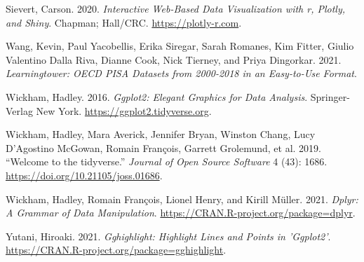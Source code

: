 \begin{CSLReferences}{1}{0}
\leavevmode{}%
Sievert, Carson. 2020. \emph{Interactive Web-Based Data Visualization with r, Plotly, and Shiny}. Chapman; Hall/CRC. \url{https://plotly-r.com}.

\leavevmode{}%
Wang, Kevin, Paul Yacobellis, Erika Siregar, Sarah Romanes, Kim Fitter, Giulio Valentino Dalla Riva, Dianne Cook, Nick Tierney, and Priya Dingorkar. 2021. \emph{Learningtower: OECD PISA Datasets from 2000-2018 in an Easy-to-Use Format}.

\leavevmode{}%
Wickham, Hadley. 2016. \emph{Ggplot2: Elegant Graphics for Data Analysis}. Springer-Verlag New York. \url{https://ggplot2.tidyverse.org}.

\leavevmode{}%
Wickham, Hadley, Mara Averick, Jennifer Bryan, Winston Chang, Lucy D'Agostino McGowan, Romain François, Garrett Grolemund, et al. 2019. {``Welcome to the {tidyverse}.''} \emph{Journal of Open Source Software} 4 (43): 1686. \url{https://doi.org/10.21105/joss.01686}.

\leavevmode{}%
Wickham, Hadley, Romain François, Lionel Henry, and Kirill Müller. 2021. \emph{Dplyr: A Grammar of Data Manipulation}. \url{https://CRAN.R-project.org/package=dplyr}.

\leavevmode{}%
Yutani, Hiroaki. 2021. \emph{Gghighlight: Highlight Lines and Points in 'Ggplot2'}. \url{https://CRAN.R-project.org/package=gghighlight}.

\end{CSLReferences}


\address{%
Priya Ravindra Dingorkar\\
Monash University\\%
Department of Econometrics and Business Statistics\\ Clayton, Australia\\
%
\url{https://www.linkedin.com/in/priya-dingorkar/}\\%
%
\href{mailto:priyadingorkar@gmail.com}{\nolinkurl{priyadingorkar@gmail.com}}%
}

\address{%
Kevin Y.X. Wang\\
University of Sydney\\%
School of Mathematics and Statistics\\ Sydney, Australia\\
%
\url{https://kevinwang09.github.io/}\\%
%
\href{mailto:kevinwangstats@gmail.com}{\nolinkurl{kevinwangstats@gmail.com}}%
}

\address{%
Dianne Cook\\
Monash University\\%
Department of Econometrics and Business Statistics\\ Clayton, Australia\\
%
\url{http://dicook.org/}\\%
%
\href{mailto:dicook@monash.edu}{\nolinkurl{dicook@monash.edu}}%
}
